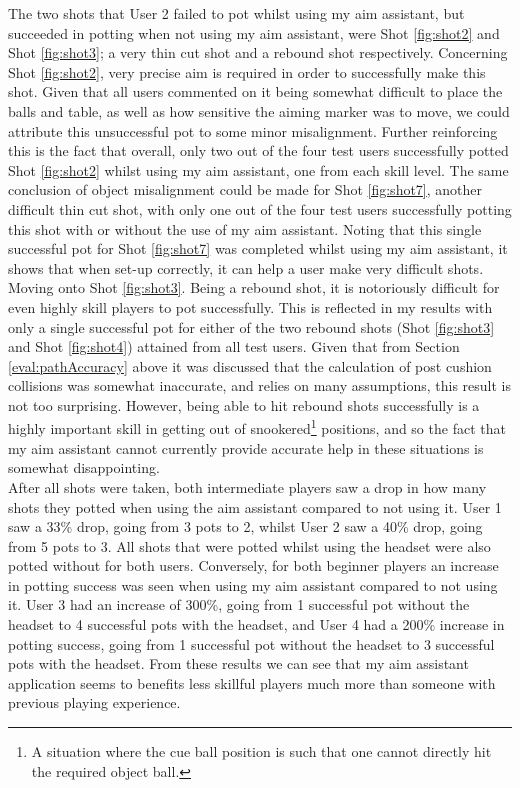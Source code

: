 \documentclass[ %
                author={Finn Alexander Wilkinson},
                supervisor={Dr. Andrew Calway},
                degree={MEng},
                title={\centering A Mixed Reality Aim Assistant for Pool and Snooker},
                subtitle={},
                type={Enterprise},
                year={2021} ]{dissertation}
\begin{document}
The two shots that User 2 failed to pot whilst using my aim assistant, but succeeded in potting when not using my aim assistant, were Shot \ref{fig:shot2} and Shot \ref{fig:shot3}; a very thin cut shot and a rebound shot respectively. Concerning Shot \ref{fig:shot2}, very precise aim is required in order to successfully make this shot. Given that all users commented on it being somewhat difficult to place the balls and table, as well as how sensitive the aiming marker was to move, we could attribute this unsuccessful pot to some minor misalignment. Further reinforcing this is the fact that overall, only two out of the four test users successfully potted Shot \ref{fig:shot2} whilst using my aim assistant, one from each skill level. The same conclusion of object misalignment could be made for Shot \ref{fig:shot7}, another difficult thin cut shot, with only one out of the four test users successfully potting this shot with or without the use of my aim assistant. Noting that this single successful pot for Shot \ref{fig:shot7} was completed whilst using my aim assistant, it shows that when set-up correctly, it can help a user make very difficult shots.\\

Moving onto Shot \ref{fig:shot3}. Being a rebound shot, it is notoriously difficult for even highly skill players to pot successfully. This is reflected in my results with only a single successful pot for either of the two rebound shots (Shot \ref{fig:shot3} and Shot \ref{fig:shot4}) attained from all test users. Given that from Section \ref{eval:pathAccuracy} above it was discussed that the calculation of post cushion collisions was somewhat inaccurate, and relies on many assumptions, this result is not too surprising. However, being able to hit rebound shots successfully is a highly important skill in getting out of snookered\footnote{A situation where the cue ball position is such that one cannot directly hit the required object ball.} positions, and so the fact that my aim assistant cannot currently provide accurate help in these situations is somewhat disappointing. \\

After all shots were taken, both intermediate players saw a drop in how many shots they potted when using the aim assistant compared to not using it. User 1 saw a 33\% drop, going from 3 pots to 2, whilst User 2 saw a 40\% drop, going from 5 pots to 3. All shots that were potted whilst using the headset were also potted without for both users. Conversely, for both beginner players an increase in potting success was seen when using my aim assistant compared to not using it. User 3 had an increase of 300\%, going from 1 successful pot without the headset to 4 successful pots with the headset, and User 4 had a 200\% increase in potting success, going from 1 successful pot without the headset to 3 successful pots with the headset. From these results we can see that my aim assistant application seems to benefits less skillful players much more than someone with previous playing experience. \\
\end{document}
